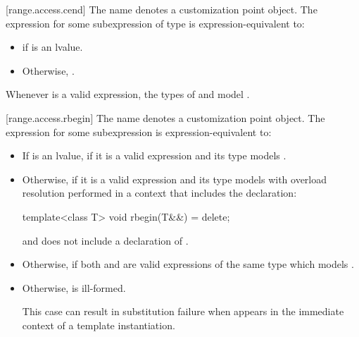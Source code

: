 \begin{addedblock}
[range.access.cend]{}
\pnum
The name  denotes a customization point
object. The expression
 for some subexpression  of type 
is expression-equivalent to:

\begin{itemize}
\item {} if  is an lvalue.
\item Otherwise, .
\end{itemize}

\pnum
\begin{note}
Whenever  is a valid expression, the
types  of  and  model
.
\end{note}

[range.access.rbegin]{}
\pnum
The name  denotes a customization point
object. The expression
 for some subexpression  is
expression-equivalent to:

\begin{itemize}
\item
  If  is an lvalue, 
  if it is a valid expression and its type  models .

\item
  Otherwise,  if it is a valid
  expression and its type  models  with overload
  resolution performed in a context that includes the declaration:
  \begin{codeblock}
  template<class T> void rbegin(T&&) = delete;
  \end{codeblock}
  and does not include a declaration of .

\item
  Otherwise,  if both
   and  are valid
  expressions of the same type  which models
  .

\item
  Otherwise,  is ill-formed.
  {\color{newclr}
  \begin{note}
  This case can result in substitution failure when 
  appears in the immediate context of a template instantiation.
  \end{note}
  } %
\end{itemize}


\end{addedblock}

